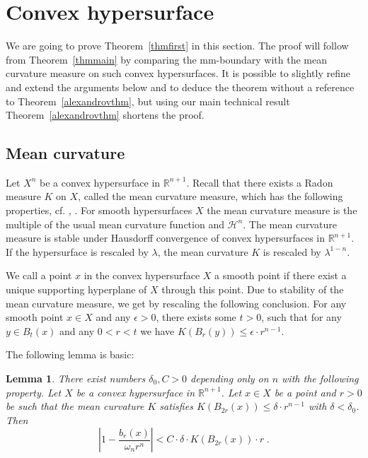 \documentclass[12pt,leqno,intlimits]{amsart}
\numberwithin{equation}{section}
\newtheorem{lem}[thm]{Lemma}
\theoremstyle{definition}
\theoremstyle{remark}
\newcommand{\tref}[1]{Theorem~\ref{#1}}
\newcommand{\R}{\mathbb{R}}
\begin{document}
\section{Convex hypersurface} \label{sec:hyper}
We are going to prove \tref{thmfirst} in this section. The proof will follow from \tref{thmmain} by comparing the mm-boundary with the mean curvature measure on such convex hypersurfaces.
It is possible to slightly refine and extend  the arguments below and to deduce the theorem without a reference to \tref{alexandrovthm}, but using  our main technical result \tref{alexandrovthm}
shortens the proof.
\subsection{Mean curvature}
Let $X^n$ be a  convex hypersurface in $\R ^{n+1}$.  Recall that there exists a Radon measure $K$ on $X$, called the mean curvature measure, which has the following properties, cf. \cite{Schneider}, \cite{Fedcurvature}.
For smooth hypersurfaces $X$ the mean curvature measure is the multiple of the usual mean curvature function and $\mathcal H^n$.  The mean curvature measure is stable under Hausdorff convergence of convex hypersurfaces in $\R^{n+1}$. 
If the hypersurface is rescaled by $\lambda$, the mean curvature $K$ is rescaled by $\lambda ^{1-n}$.

We call a point $x$ in the convex hypersurface $X$ a smooth point if there exist a unique supporting hyperplane of $X$ through this point.
Due to stability of the mean curvature measure, we get by rescaling the following conclusion.
For any smooth point $x\in X$ and any $\epsilon >0$, there exists some $t>0$, such that
for any $y\in B_{t} (x)$ and any $0<r<t$ we have $K(B_r(y))  \leq \epsilon \cdot r^{n-1}$.








The following lemma is basic:

\begin{lem}  \label{lem:mean}
There exist numbers $\delta _0,C>0$ depending only on $n$ with the following property. Let $X$ be a convex hypersurface in $\R^{n+1}$.
Let $x\in X$ be a point and $r>0$ be such that the mean curvature $K$ satisfies  $K(B_{2r} (x))  \leq \delta \cdot r^{n-1}$ with $\delta <\delta _0$.
Then $$| 1 -  \frac {b_r (x)} { \omega _n r^n}| <C\cdot \delta \cdot K( B_{2r} (x)) \cdot r \; .$$
\end{lem}
\end{document}
